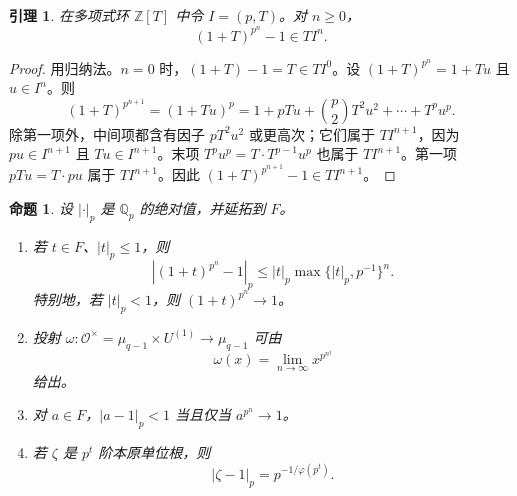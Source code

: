 \documentclass[11pt,a4paper,openany]{ctexbook}
\numberwithin{equation}{chapter}
\newcommand{\Q}{\mathbb{Q}}
\newcommand{\Z}{\mathbb{Z}}
\theoremstyle{plain}
\newtheorem{proposition}[theorem]{命题}
\newtheorem{lemma}[theorem]{引理}
\theoremstyle{definition}
\theoremstyle{remark}
\begin{document}
\begin{lemma}
在多项式环 $\Z[T]$ 中令 $I=(p,T)$。对 $n\ge0$，
\[
(1+T)^{p^n}-1\in T I^n.
\]
\end{lemma}

\begin{proof}
用归纳法。$n=0$ 时，$(1+T)-1=T\in TI^0$。设
$(1+T)^{p^n}=1+Tu$ 且 $u\in I^n$。则
\[
(1+T)^{p^{n+1}}=(1+Tu)^p
=1+pTu+\binom p2T^2u^2+\cdots+T^pu^p.
\]
除第一项外，中间项都含有因子 $pT^2u^2$ 或更高次；它们属于 $TI^{n+1}$，因为
$p u\in I^{n+1}$ 且 $T u\in I^{n+1}$。末项 $T^pu^p=T\cdot T^{p-1}u^p$ 也属于
$TI^{n+1}$。第一项 $pTu=T\cdot pu$ 属于 $TI^{n+1}$。因此
$(1+T)^{p^{n+1}}-1\in TI^{n+1}$。
\end{proof}

\begin{proposition}
设 $|\cdot|_p$ 是 $\Q_p$ 的绝对值，并延拓到 $F$。
\begin{enumerate}[label=(\arabic*)]
\item 若 $t\in F$、$|t|_p\le1$，则
\[
|(1+t)^{p^n}-1|_p
\le |t|_p\max\{|t|_p,p^{-1}\}^n.
\]
特别地，若 $|t|_p<1$，则 $(1+t)^{p^n}\to1$。
\item 投射 $\omega:\mathcal O^\times=\mu_{q-1}\times U^{(1)}\to\mu_{q-1}$ 可由
\[
\omega(x)=\lim_{n\to\infty}x^{p^{n!}}
\]
给出。
\item 对 $a\in F$，$|a-1|_p<1$ 当且仅当 $a^{p^n}\to1$。
\item 若 $\zeta$ 是 $p^t$ 阶本原单位根，则
\[
|\zeta-1|_p=p^{-1/\varphi(p^t)}.
\]
\end{enumerate}
\end{proposition}
\end{document}
